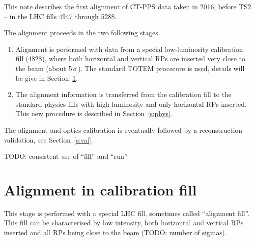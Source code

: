 \documentclass[TOTEM]{cern/cernphprep}
\def\un#1{\,{\rm #1}}
\def\TODO#1{{\color{red}TODO: #1}}
\def\hang{\hangindent=\parindent}
\def\>{\par\vskip\itskip\parindent\itindent\indent\hang\llap{\hbox to3mm{$\bullet$\hss}}}
\def\>E{\par\vskip\itskip\parindent\itindent\indent\hang\llap{\hbox to3mm{\hss}}}
\def\>>{\par\vskip\iitskip\parindent\iitindent\indent\hang\llap{\hbox to\iitindent{\hss--\ }}}
\begin{document}
This note describes the first alignment of CT-PPS data taken in 2016, before TS2 -- in the LHC fills 4947 through 5288. 

The alignment proceeds in the two following stages.
\begin{enumerate}[noitemsep]
\item Alignment is performed with data from a special low-luminosity calibration fill (4828), where both horizontal and vertical RPs are inserted very close to the beam (about $5\un{\sigma}$). The standard TOTEM procecure \cite{totem-ijmp} is used, details will be give in Section~\ref{s:calib}.
\item The alignment information is transferred from the calibration fill to the standard physics fills with high luminosity and only horizontal RPs inserted. This new procedure is described in Section~\ref{s:phys}.
\end{enumerate}

The alignment and optics calibration \cite{optics_calibration} is eventually followed by a reconstruction validation, see Section~\ref{s:val}.

\> \TODO{consistent use of ``fill'' and ``run''}


\section{Alignment in calibration fill}
\label{s:calib}

This stage is performed with a special LHC fill, sometimes called ``alignment fill''. This fill can be characterised by low intensity, both horizontal and vertical RPs inserted and all RPs being close to the beam (\TODO{number of sigmas}).
\end{document}
